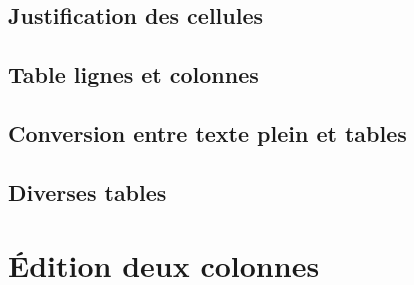 \subsection{Justification des cellules} 
\subsection{Table lignes et colonnes} 
\subsection{Conversion entre texte plein et tables} 
\subsection{Diverses tables} 
\section{\'Edition deux colonnes} 
